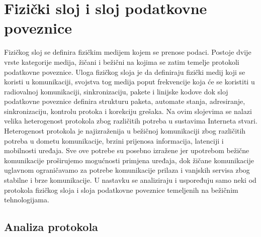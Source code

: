 \documentclass[times, utf8, diplomski]{fer}
\begin{document}
\section{Fizički sloj i sloj podatkovne poveznice}
 Fizičkog sloj se definira fizičkim medijem kojem se prenose podaci. Postoje dvije vrste kategorije medija, žičani i bežični na kojima se zatim temelje protokoli podatkovne poveznice. Uloga fizičkog sloja je da definiraju fizički medij koji se koristi u komunikaciji, svojstva tog medija poput frekvencije koja će se koristiti u radiovalnoj komunikaciji, sinkronizaciju, pakete i linijske kodove dok sloj podatkovne poveznice definira strukturu paketa, automate stanja, adresiranje, sinkronizaciju, kontrolu protoka i korekciju grešaka. Na ovim slojevima se nalazi velika heterogenost protokola zbog različitih potreba u sustavima Interneta stvari. Heterogenost protokola je najizraženija u bežičnoj komunikaciji zbog različitih potreba u dometu komunikacije, brzini prijenosa informacija, latenciji i mobilnosti uređaja. Sve ove potrebe su posebno izražene jer upotrebom bežične komunikacije proširujemo mogućnosti primjena uređaja, dok žičane komunikacije uglavnom ograničavamo za potrebe komunikacije prilaza i vanjskih servisa zbog stabilne i brze komunikacije. U nastavku se analiziraju i uspoređuju samo neki od protokola fizičkog sloja i sloja podatkovne poveznice temeljenih na bežičnim tehnologijama.

\subsection{Analiza protokola}
\end{document}

